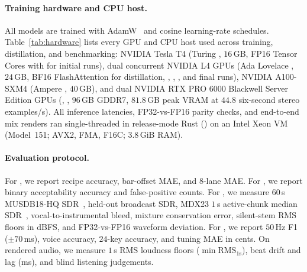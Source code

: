 

\paragraph{Training hardware and CPU host.}
All models are trained with AdamW~\citep{loshchilov2019decoupled} and cosine learning-rate schedules. Table~\ref{tab:hardware} lists every GPU and CPU host used across training, distillation, and benchmarking: NVIDIA Tesla T4 (Turing , $16$\,GB, FP16 Tensor Cores with  for initial  runs), dual concurrent NVIDIA L4 GPUs (Ada Lovelace , $24$\,GB, BF16 FlashAttention for  distillation, , , , and final  runs), NVIDIA A100-SXM4 (Ampere , $40$\,GB), and dual NVIDIA RTX PRO 6000 Blackwell Server Edition GPUs (, , $96$\,GB GDDR7, $81.8$\,GB peak VRAM at $44.8$ six-second stereo examples/s). All inference latencies, FP32-vs-FP16 parity checks, and end-to-end mix renders ran single-threaded in release-mode Rust () on an Intel Xeon VM (Model~151; AVX2, FMA, F16C; $3.8$\,GiB RAM).



\paragraph{Evaluation protocol.}
For , we report recipe accuracy, bar-offset MAE, and 8-lane MAE. For , we report binary acceptability accuracy and false-positive counts. For , we measure $60$\,s MUSDB18-HQ SDR~\citep{vincent2006performance}, held-out broadcast SDR, MDX23 $1$\,s active-chunk median SDR~\citep{fabbro2024sdx}, vocal-to-instrumental bleed, mixture conservation error, silent-stem RMS floors in dBFS, and FP32-vs-FP16 waveform deviation. For , we report $50$\,Hz F1 ($\pm 70$\,ms), voice accuracy, $24$-key accuracy, and tuning MAE in cents. On rendered audio, we measure $1$\,s RMS loudness floors ($\min \mathrm{RMS}_{1\text{s}}$), beat drift and lag (ms), and blind listening judgements.
